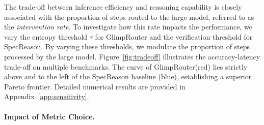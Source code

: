 \documentclass[11pt]{article}
\newcommand{\zeng}[1]{\textcolor[rgb]{1,0.66,0}{\textbf{[Zeng: #1]}}}
\newcommand{\approach}{{GlimpRouter}\xspace}
\begin{document}
The trade-off between inference efficiency and reasoning capability is closely associated with the proportion of steps routed to the large model, referred to as the \textit{intervention rate}. To investigate how this rate impacts the performance, we vary the entropy threshold $\tau$ for \approach and the verification threshold for SpecReason. By varying these thresholds, we modulate the proportion of steps processed by the large model. Figure~\ref{fig:tradeoff} illustrates the accuracy-latency trade-off on multiple benchmarks. 
The curve of \approach (red) lies strictly above and to the left of the SpecReason baseline (blue), establishing a superior Pareto frontier. 
Detailed numerical results are provided in Appendix~\ref{app:sensitivity}.




\paragraph{Impact of Metric Choice.}
\label{ssec:metric_ablation}
\end{document}
